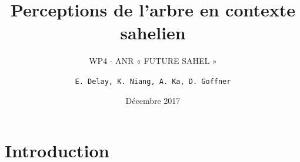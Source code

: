 \documentclass[newPxFont]{beamer}
\title{Perceptions de l’arbre en contexte sahelien}
\subtitle{WP4 - ANR « FUTURE SAHEL »}
\date{Décembre 2017}
\author{\texttt{E. Delay, K. Niang, A. Ka, D. Goffner}}
\institute{OHMi Téssékéré - UMI 3189 CNRS}
\begin{document}
%
%


\maketitle


%
%


\section{Introduction}
\end{document}
